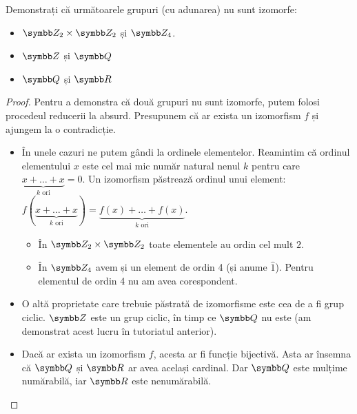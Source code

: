 \begin{exercise}
Demonstrați că următoarele grupuri (cu adunarea) nu sunt izomorfe:
\begin{itemize}
    \item \(\integersmod{2} \times \integersmod{2}\) și \(\integersmod{4}\).
    \item \(\integers\) și \(\rationals\)
    \item \(\rationals\) și \(\reals\)
\end{itemize}
\end{exercise}
\begin{proof}
Pentru a demonstra că două grupuri nu sunt izomorfe, putem folosi procedeul reducerii la absurd. Presupunem că ar exista un izomorfism \(f\) și ajungem la o contradicție.
\begin{itemize}
    \item În unele cazuri ne putem gândi la ordinele elementelor. Reamintim că ordinul elementului \(x\) este cel mai mic număr natural nenul \(k\) pentru care \(\underbrace{x + \dots + x}_{k \text{ ori}} = 0\). Un izomorfism păstrează ordinul unui element: \(f(\underbrace{x + \dots + x}_{k \text{ ori}}) = \underbrace{f(x) + \dots + f(x)}_{k \text{ ori}}\).
        \begin{itemize}
            \item În \(\integersmod{2} \times \integersmod{2}\) toate elementele au ordin cel mult \(2\).
            \item În \(\integersmod{4}\) avem și un element de ordin 4 (și anume \(\widehat{1}\)). Pentru elementul de ordin 4 nu am avea corespondent.
        \end{itemize}

    \item O altă proprietate care trebuie păstrată de izomorfisme este cea de a fi grup ciclic. \(\integers\) este un grup ciclic, în timp ce \(\rationals\) nu este (am demonstrat acest lucru în tutoriatul anterior).

    \item Dacă ar exista un izomorfism \(f\), acesta ar fi funcție bijectivă. Asta ar însemna că \(\rationals\) și \(\reals\) ar avea același cardinal. Dar \(\rationals\) este mulțime numărabilă, iar \(\reals\) este nenumărabilă.
\end{itemize}
\end{proof}

\pagebreak

